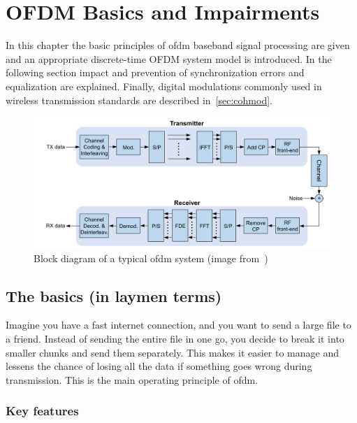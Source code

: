 \chapter{OFDM Basics and Impairments}\label{sec:basic}

In this chapter the basic principles of \gls{ofdm} baseband signal processing are given and an appropriate discrete-time OFDM system model is introduced. In the following section impact and prevention of synchronization errors and equalization are explained. Finally, digital modulations commonly used in wireless transmission standards are described in~\cref{sec:cohmod}.

\begin{figure}[htbp]
\centering
\includegraphics[width=\linewidth]{figs/ofdm_block.png}
\caption{Block diagram of a typical \gls{ofdm} system (image from~\cite{arslan2020flexible})}\label{fig:block_diagram}
\end{figure}

\section{The basics (in laymen terms)}\label{sec:ofdm-laymen}
Imagine you have a fast internet connection, and you want to send a large file to a friend. Instead of sending the entire file in one go, you decide to break it into smaller chunks and send them separately. This makes it easier to manage and lessens the chance of losing all the data if something goes wrong during transmission. This is the main operating principle of \gls{ofdm}.

\subsection{Key features}

